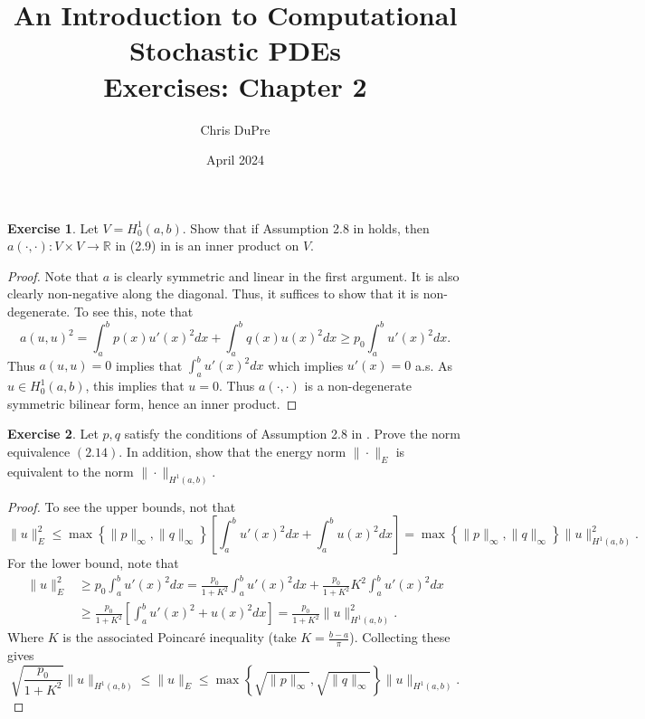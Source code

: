 \documentclass{amsart}
\title{An Introduction to Computational Stochastic PDEs\\ Exercises: Chapter 2}
\author{Chris DuPre }
\date{April 2024}
\theoremstyle{plain}
\theoremstyle{definition}
\newtheorem{exer}{Exercise}[section]
\newcommand{\R}{\mathbb{R}}
\begin{document}
\maketitle
\setcounter{section}{2}
\begin{exer}
    Let $V = H_0^1(a,b).$ Show that if Assumption 2.8 in \cite{lord2014introduction} holds, then $a(\cdot,\cdot): V\times V\to \R$ in (2.9) in \cite{lord2014introduction} is an inner product on $V.$
\end{exer}
\begin{proof}
Note that $a$ is clearly symmetric and linear in the first argument. It is also clearly non-negative along the diagonal. Thus, it suffices to show that it is non-degenerate. To see this, note that 
$$a(u,u) ^2= \int_{a}^b p(x) u'(x)^2 dx + \int_a^b q(x) u(x)^2 dx \geq p_0\int_{a}^b u'(x)^2 dx.$$
Thus $a(u,u) = 0$ implies that $\int_a^b u'(x)^2 dx$ which implies $u'(x) = 0$ a.s. As $u \in H_0^1(a,b)$, this implies that $u = 0.$ Thus $a(\cdot,\cdot)$ is a non-degenerate symmetric bilinear form, hence an inner product. 
\end{proof}

\begin{exer}
    Let $p,q$ satisfy the conditions of Assumption 2.8 in \cite{lord2014introduction}. Prove the norm equivalence $(2.14).$ In addition, show that the energy norm $\|\cdot \|_{E}$ is equivalent to the norm $\|\cdot \|_{H^1(a,b)}.$
\end{exer}
\begin{proof}
    To see the upper bounds, not that 
    $$\|u\|_{E}^2 \leq \max\left\{\|p\|_{\infty},\|q\|_{\infty}\right\} \left[\int_a^b u'(x)^2 dx + \int_a^b u(x)^2 dx\right] = \max\left\{\|p\|_{\infty},\|q\|_{\infty}\right\} \|u\|_{H^1(a,b)}^2.$$
    For the lower bound, note that 
    \begin{align*}
        \|u\|_{E}^2 & \geq p_0 \int_a^b u'(x)^2 dx = \frac{p_0}{1+K^2} \int_a^b u'(x)^2 dx + \frac{p_0 }{1+K^2} K^2 \int_a^b u'(x)^2 dx \\
        & \geq \frac{p_0}{1+K^2}\left[\int_a^b u'(x)^2 +u(x)^2 dx \right] = \frac{p_0}{1+K^2} \|u\|_{H^1(a,b)}^2.
    \end{align*}
    Where $K$ is the associated Poincar\'e inequality (take $K = \frac{b-a}{\pi}$). Collecting these gives
    $$\sqrt{\frac{p_0}{1+K^2}}\|u\|_{H^1(a,b)} \leq \|u\|_{E} \leq \max\left\{\sqrt{\|p\|_{\infty}},\sqrt{\|q\|_{\infty}}\right\}\|u\|_{H^1(a,b)}.$$
\end{proof}
\end{document}
